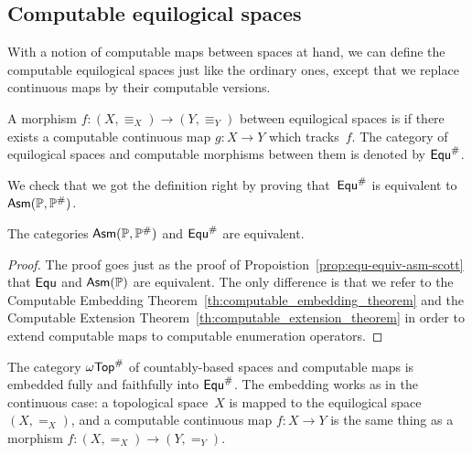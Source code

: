 
\subsection{Computable equilogical spaces}
\label{sec:computable-equ}


With a notion of computable maps between spaces at hand, we can define
the computable equilogical spaces just like the ordinary ones, except
that we replace continuous maps by their computable versions.

\begin{definition}
  \label{def:computable-equ}%
  A morphism $f : (X, {\equiv_X}) \to (Y, {\equiv_Y})$ between
  equilogical spaces is  if there exists a computable
  continuous map $g : X \to Y$ which tracks~$f$.
  The category of equilogical spaces and computable morphisms between
  them is denoted by $\mathsf{Equ}^{\#}$.
\end{definition}

We check that we got the definition right by proving
that~$\mathsf{Equ}^{\#}$ is equivalent to $\mathsf{Asm}(\mathbb{P}, \mathbb{P}^{\#})$.

\begin{proposition}
  \label{th:equivalence_compEqu_AsmScott}%
  The categories $\mathsf{Asm}(\mathbb{P}, \mathbb{P}^{\#})$ and $\mathsf{Equ}^{\#}$ are
  equivalent.
\end{proposition}

\begin{proof}
  The proof goes just as the proof of
  Propoistion~\ref{prop:equ-equiv-asm-scott} that $\mathsf{Equ}$ and
  $\mathsf{Asm}(\mathbb{P})$ are equivalent. The only difference is that we refer
  to the Computable Embedding
  Theorem~\ref{th:computable_embedding_theorem} and the Computable
  Extension Theorem~\ref{th:computable_extension_theorem} in order to
  extend computable maps to computable enumeration operators.
\end{proof}

The category $\mathsf{\omega Top}^{\#}$ of countably-based spaces and computable
maps is embedded fully and faithfully into $\mathsf{Equ}^{\#}$. The
embedding works as in the continuous case: a topological space~$X$ is
mapped to the equilogical space $(X, {=_X})$, and a computable
continuous map $f : X \to Y$ is the same thing as a morphism $f : (X,
{=_X}) \to (Y, {=_Y})$.



